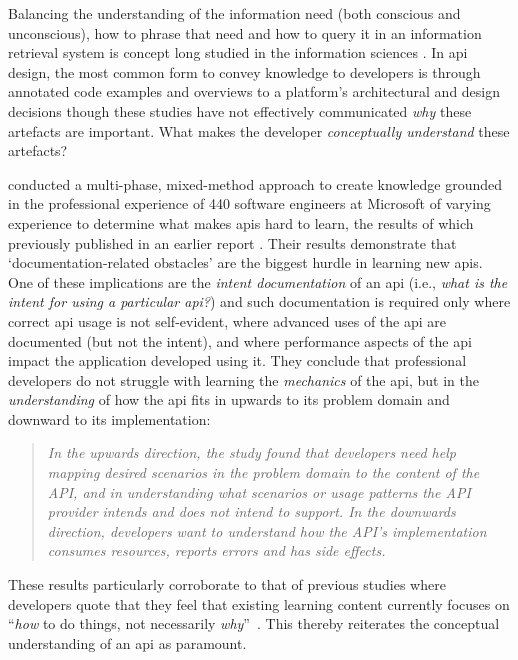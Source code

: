 Balancing the understanding of the information need (both conscious and unconscious), how to phrase that need and how to query it in an information retrieval system is concept long studied in the information sciences \citep{Taylor:1968tq}. In \gls{api} design, the most common form to convey knowledge to developers is through annotated code examples and overviews to a platform's architectural and design decisions \citep{Myers:2011bt,Robillard:2011uv,Dorn:2010wl,Brandt:2009tm} though these studies have not effectively communicated \textit{why} these artefacts are important. What makes the developer \textit{conceptually understand} these artefacts?

\citet{Robillard:2011uv} conducted a multi-phase, mixed-method approach to create knowledge grounded in the professional experience of 440 software engineers at Microsoft of varying experience to determine what makes \glspl{api} hard to learn, the results of which previously published in an earlier report \citep{Robillard:2009uk}. Their results demonstrate that `documentation-related obstacles' are the biggest hurdle in learning new \glspl{api}. One of these implications are the \textit{intent documentation} of an \gls{api} (i.e., \textit{what is the intent for using a particular \gls{api}?}) and such documentation is required only where correct \gls{api} usage is not self-evident, where advanced uses of the \gls{api} are documented (but not the intent), and where performance aspects of the \gls{api} impact the application developed using it. They conclude that professional developers do not struggle with learning the \textit{mechanics} of the \gls{api}, but in the \textit{understanding} of how the \gls{api} fits in upwards to its problem domain and downward to its implementation:

\begin{quote}
  \itshape
  In the \textup{upwards} direction, the study found that developers need help mapping desired scenarios in the problem domain to the content of the API, and in understanding what scenarios or usage patterns the API provider intends and does not intend to support. In the \textup{downwards} direction, developers want to understand how the API's implementation consumes resources, reports errors and has side effects. 
  \upshape
  \citep{Robillard:2011uv}
\end{quote}


These results particularly corroborate to that of previous studies where developers quote that they feel that existing learning content currently focuses on ``\textit{how} to do things, not necessarily \textit{why}''~\citep{Nykaza:2002td}. This thereby reiterates the conceptual understanding of an \gls{api} as paramount.

